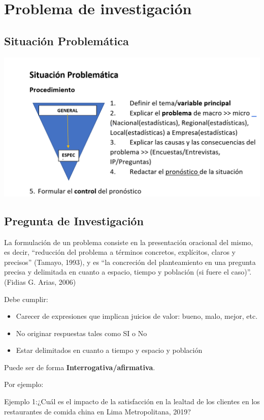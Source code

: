 \chapter{Problema de investigación}
\label{Problemática}

\section{Situación Problemática}

\includegraphics[scale=0.5]{img/problem_sec.png}

\section{Pregunta de Investigación}

La formulación de un problema consiste en la presentación oracional del mismo, es decir, “reducción del problema a términos concretos, explícitos, claros y precisos” (Tamayo, 1993), y es “la concreción del planteamiento en una pregunta precisa y delimitada en cuanto a espacio, tiempo y población (si fuere el caso)”. (Fidias G. Arias, 2006)

Debe cumplir:
\begin{itemize}
    \item Carecer de expresiones que implican juicios de valor: bueno, malo, mejor, etc.
    \item No originar respuestas tales como SI o No
    \item Estar delimitados en cuanto a tiempo y espacio y población
\end{itemize}

Puede ser de forma \textbf{Interrogativa/afirmativa}.


Por ejemplo:

Ejemplo 1:¿Cuál es el impacto de la satisfacción en la lealtad de los clientes en los restaurantes de comida china en Lima Metropolitana, 2019?


